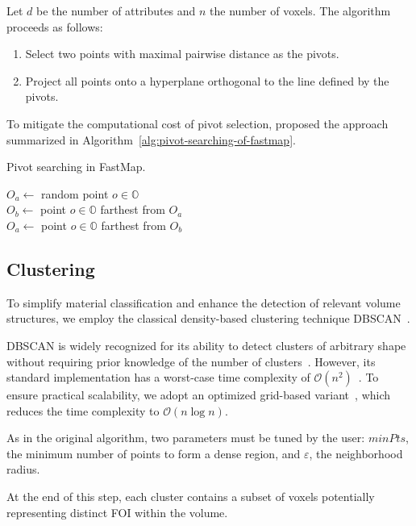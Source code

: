 Let $d$ be the number of attributes and $n$ the number of voxels. The algorithm proceeds as follows:

\begin{enumerate}
    \item Select two points with maximal pairwise distance as the pivots.
    \item Project all points onto a hyperplane orthogonal to the line defined by the pivots.
\end{enumerate}

To mitigate the computational cost of pivot selection, \citet{faloutsos1995} proposed the approach summarized in Algorithm~\ref{alg:pivot-searching-of-fastmap}.

\begin{algorithm}
    \caption{Pivot searching in FastMap.}
    \label{alg:pivot-searching-of-fastmap}
    $O_a \gets$ random point $o \in \mathbb{O}$\\
    $O_b \gets$ point $o \in \mathbb{O}$ farthest from $O_a$\\
    $O_a \gets$ point $o \in \mathbb{O}$ farthest from $O_b$
\end{algorithm}

\subsection{Clustering}
\label{subsect:clustering}

To simplify material classification and enhance the detection of relevant volume structures, we employ the classical density-based clustering technique DBSCAN~\cite{ester1996}.

DBSCAN is widely recognized for its ability to detect clusters of arbitrary shape without requiring prior knowledge of the number of clusters~\cite{schubert2017}. However, its standard implementation has a worst-case time complexity of $\mathcal{O}(n^2)$~\cite{schubert2017}. To ensure practical scalability, we adopt an optimized grid-based variant~\cite{gunawan2013}, which reduces the time complexity to $\mathcal{O}(n \log n)$.

As in the original algorithm, two parameters must be tuned by the user: $minPts$, the minimum number of points to form a dense region, and $\varepsilon$, the neighborhood radius.

At the end of this step, each cluster contains a subset of voxels potentially representing distinct FOI within the volume.

